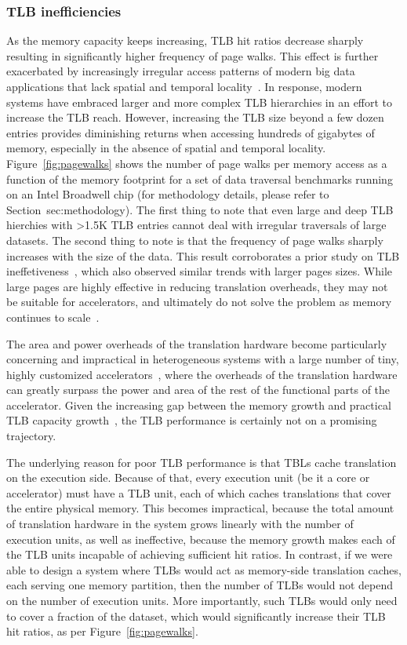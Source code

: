 \subsubsection{TLB inefficiencies}
As the memory capacity keeps increasing, TLB hit ratios decrease sharply~\cite{basu:efficient} resulting in significantly higher frequency of page walks. This effect is further exacerbated by increasingly irregular access patterns of modern big data applications that lack spatial and temporal locality~\cite{haria:devirtualizing}. In response, modern systems have embraced larger and more complex TLB hierarchies in an effort to increase the TLB reach. However, increasing the TLB size beyond a few dozen entries provides diminishing returns when accessing hundreds of gigabytes of memory, especially in the absence of spatial and temporal locality. Figure~\ref{fig:pagewalks} shows the number of page walks per memory access as a function of the memory footprint for a set of data traversal benchmarks running on an Intel Broadwell chip (for methodology details, please refer to Section~{sec:methodology}). The first thing to note that even large and deep TLB hierchies with >1.5K TLB entries cannot deal with irregular traversals of large datasets. The second thing to note is that the frequency of page walks sharply increases with the size of the data. This result corroborates a prior study on TLB ineffetiveness~\cite{basu:efficient}, which also observed similar trends with larger pages sizes. While large pages are highly effective in reducing translation overheads, they may not be suitable for accelerators, and ultimately do not solve the problem as memory continues to scale~\cite{basu:efficient}.	

The area and power overheads of the translation hardware become particularly concerning and impractical in heterogeneous systems with a large number of tiny, highly customized accelerators~\cite{haria:devirtualizing}, where the overheads of the translation hardware can greatly surpass the power and area of the rest of the functional parts of the accelerator. Given the increasing gap between the memory growth and practical TLB capacity growth~\cite{gandhi:badgertrap}, the TLB performance is certainly not on a promising trajectory.

The underlying reason for poor TLB performance is that TBLs cache translation on the execution side. Because of that, every execution unit (be it a core or accelerator) must have a TLB unit, each of which caches translations that cover the entire physical memory. This becomes impractical, because the total amount of translation hardware in the system grows linearly with the number of execution units, as well as ineffective, because the memory growth makes each of the TLB units incapable of achieving sufficient hit ratios. In contrast, if we were able to design a system where TLBs would act as memory-side translation caches, each serving one memory partition, then the number of TLBs would not depend on the number of execution units. More importantly, such TLBs would only need to cover a fraction of the dataset, which would significantly increase their TLB hit ratios, as per Figure~\ref{fig:pagewalks}.

